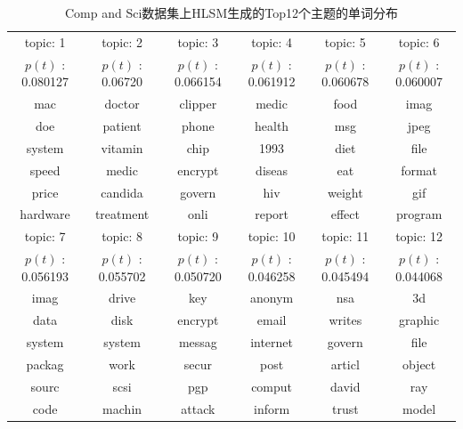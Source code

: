 \begin{table}[ht]
\centering
\caption{Comp and Sci数据集上HLSM生成的Top12个主题的单词分布}
{\scriptsize
 \setlength{\abovecaptionskip}{3pt}
\setlength{\belowcaptionskip}{11pt}
\newcommand{\tabincell}[5]{\begin{tabular}{@{}#1@{}}#2\end{tabular}}
\label{table:topics}
\begin{tabular}{|c|c|c|c|c|c|}
\hline
topic: 1  & topic: 2 & topic: 3 &  topic: 4 &  topic: 5 & topic: 6 \\
$p(t)$ : 0.080127 & $p(t)$ : 0.06720 & $p(t)$ : 0.066154 & $p(t)$ : 0.061912 & $p(t)$ : 0.060678 & $p(t)$ : 0.060007\\
\hline
mac & doctor & clipper & medic & food & imag\\
doe & patient & phone & health & msg & jpeg\\
system & vitamin & chip & 1993 & diet & file\\
speed & medic & encrypt & diseas & eat & format\\
price & candida & govern & hiv & weight & gif\\
hardware & treatment & onli & report & effect & program\\
\hline
topic: 7  & topic: 8 & topic: 9 &  topic: 10 &  topic: 11 & topic: 12 \\
$p(t)$ : 0.056193 & $p(t)$ : 0.055702 & $p(t)$ : 0.050720 & $p(t)$ : 0.046258 & $p(t)$ : 0.045494 & $p(t)$ : 0.044068\\
\hline
imag & drive        & key        & anonym & nsa     & 3d\\
data & disk          & encrypt & email & writes       & graphic\\
system & system & messag & internet & govern & file\\
packag & work     & secur    & post & articl         & object\\
sourc & scsi         & pgp       & comput & david     & ray\\
code & machin   & attack    & inform & trust       & model\\
\hline
\end{tabular}}
\end{table}

